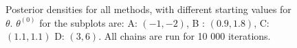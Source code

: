 \begin{figure}[ht]
    \caption{Posterior densities for all methods, with different starting values for $\theta$. $\theta^{\left(0\right)}$ for the subplots are:   A: $(-1, -2)$, B : $(0.9, 1.8)$, C: $(1.1, 1.1)$ D: $(3, 6)$. All chains are run for 10 000 iterations.}%
    \label{fig:density_10k_02_06}%
\end{figure}




